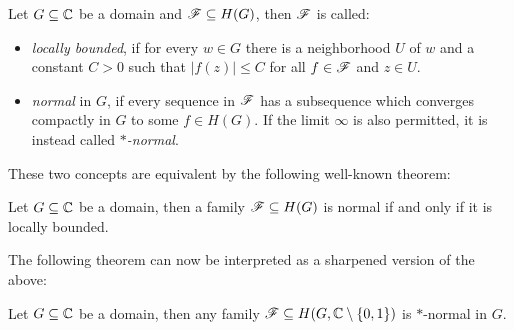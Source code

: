 \begin{definition} \label{def:normal-family}
    Let $G \subseteq \mathbb{C}$ be a domain and $\mathscr{F} \subseteq H(G)$, then $\mathscr{F}$ is called:
    \begin{itemize}
        \item \emph{locally bounded}, if for every $w \in G$ there is a neighborhood $U$ of $w$ and a constant $C > 0$ such that $\vert f(z) \vert \leq C$ for all $f \in \mathscr{F}$ and $z \in U$.
        \item \emph{normal} in $G$, if every sequence in $\mathscr{F}$ has a subsequence which converges compactly in $G$ to some $f \in H(G)$. If the limit $\infty$ is also permitted, it is instead called \emph{$\ast$-normal}.
    \end{itemize}
\end{definition}

These two concepts are equivalent by the following well-known theorem:

\begin{theorem}[Montel] \label{thm:montel}
    Let $G \subseteq \mathbb{C}$ be a domain, then a family $\mathscr{F} \subseteq H(G)$ is normal if and only if it is locally bounded.
\end{theorem}

The following theorem can now be interpreted as a sharpened version of the above:

\begin{theorem} \label{lem:montel-sharpened}
    Let $G \subseteq \mathbb{C}$ be a domain, then any family $\mathscr{F} \subseteq H(G, \mathbb{C} \setminus \{ 0, 1 \})$ is $\ast$-normal in $G$.
\end{theorem}

